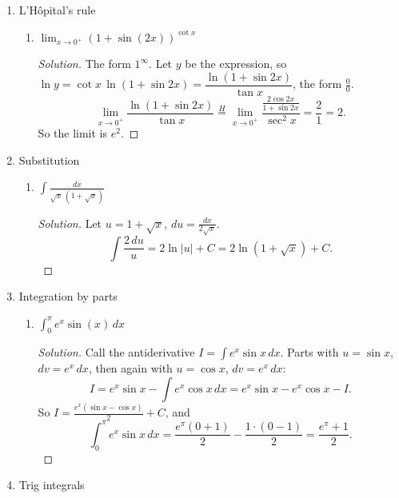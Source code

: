 \documentclass[12pt]{article}
\newenvironment{solution}
  {\renewcommand\qedsymbol{$\blacksquare$}\begin{proof}[Solution]}
  {\end{proof}}
\begin{document}
\begin{enumerate}
\begin{enumerate}
\end{enumerate}

\setcounter{enumi}{6}
\item L'H\^opital's rule
\begin{enumerate}

\item[(b)] $\lim_{x\to0^+}(1+\sin(2x))^{\cot x}$
\begin{solution}
The form $1^\infty$. Let $y$ be the expression, so $\ln y=\cot x\,\ln(1+\sin 2x)=\dfrac{\ln(1+\sin2x)}{\tan x}$, the form $\frac00$.
\[ \lim_{x\to0^+}\frac{\ln(1+\sin2x)}{\tan x}\overset{H}{=}\lim_{x\to0^+}\frac{\frac{2\cos 2x}{1+\sin2x}}{\sec^2x}=\frac{2}{1}=2. \]
So the limit is $e^2$.
\end{solution}






\end{enumerate}

\setcounter{enumi}{7}
\item Substitution
\begin{enumerate}




\item[(e)] $\int\frac{dx}{\sqrt x\,(1+\sqrt x)}$
\begin{solution}
Let $u=1+\sqrt x$, $du=\frac{dx}{2\sqrt x}$.
\[ \int\frac{2\,du}{u}=2\ln|u|+C=2\ln(1+\sqrt x)+C. \]
\end{solution}

\end{enumerate}

\setcounter{enumi}{8}
\item Integration by parts
\begin{enumerate}

\item[(b)] $\int_0^\pi e^x\sin(x)\,dx$
\begin{solution}
Call the antiderivative $I=\int e^x\sin x\,dx$. Parts with $u=\sin x$, $dv=e^x\,dx$, then again with $u=\cos x$, $dv=e^x\,dx$:
\[ I=e^x\sin x-\int e^x\cos x\,dx=e^x\sin x-e^x\cos x-I. \]
So $I=\frac{e^x(\sin x-\cos x)}{2}+C$, and
\[ \int_0^\pi e^x\sin x\,dx=\frac{e^\pi(0+1)}{2}-\frac{1\cdot(0-1)}{2}=\frac{e^\pi+1}{2}. \]
\end{solution}




\end{enumerate}

\setcounter{enumi}{9}
\item Trig integrals
\begin{enumerate}



\end{enumerate}
\end{enumerate}
\end{document}

